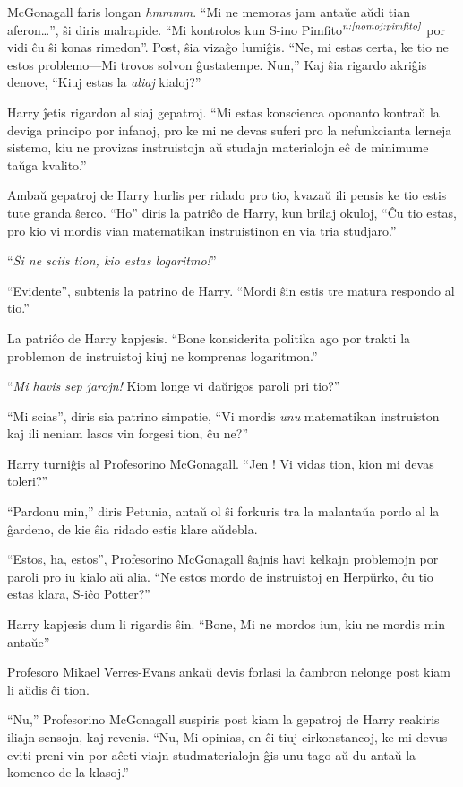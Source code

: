 McGonagall faris longan \emph{hmmmm}. ``Mi ne memoras jam antaŭe aŭdi
tian aferon\ldots{}'', ŝi diris malrapide. ``Mi kontrolos kun S-ino
Pimfito$^{\textit{n:\ref{nomoj:pimfito}}}$ por vidi ĉu ŝi konas rimedon''. Post,
ŝia vizaĝo lumiĝis. ``Ne, mi estas certa, ke tio ne estos problemo—Mi
trovos solvon ĝustatempe. Nun,'' Kaj ŝia rigardo akriĝis denove,
``Kiuj estas la \emph{aliaj} kialoj?''

Harry ĵetis rigardon al siaj gepatroj. ``Mi estas konscienca oponanto
kontraŭ la deviga principo por infanoj, pro ke mi ne devas suferi pro
la nefunkcianta lerneja sistemo, kiu ne provizas instruistojn aŭ
studajn materialojn eĉ de minimume taŭga kvalito.''

Ambaŭ gepatroj de Harry hurlis per ridado pro tio, kvazaŭ ili
pensis ke tio estis tute granda ŝerco. ``Ho'' diris la patriĉo de Harry,
kun brilaj okuloj, ``Ĉu tio estas, pro kio vi mordis vian matematikan
instruistinon en via tria studjaro.''

``\emph{Ŝi ne sciis tion, kio estas logaritmo!}''

``Evidente'', subtenis la patrino de Harry. ``Mordi ŝin estis tre matura
respondo al tio.''

La patriĉo de Harry kapjesis. ``Bone konsiderita politika ago por trakti la
problemon de instruistoj kiuj ne komprenas logaritmon.''

``\emph{Mi havis sep jarojn!} Kiom longe vi daŭrigos paroli pri tio?''

``Mi scias'', diris sia patrino simpatie, ``Vi mordis \emph{unu} matematikan
instruiston kaj ili neniam lasos vin forgesi tion, ĉu ne?''

Harry turniĝis al Profesorino McGonagall. ``Jen ! Vi vidas tion, kion mi
devas toleri?''

``Pardonu min,'' diris Petunia, antaŭ ol ŝi forkuris tra la malantaŭa
pordo al la ĝardeno, de kie ŝia ridado estis klare aŭdebla.

``Estos, ha, estos'', Profesorino McGonagall ŝajnis havi kelkajn
problemojn por paroli pro iu kialo aŭ alia. ``Ne estos mordo de
instruistoj en Herpŭrko, ĉu tio estas klara, S-iĉo Potter?''

Harry kapjesis dum li rigardis ŝin. ``Bone, Mi ne mordos iun, kiu ne mordis min antaŭe''

Profesoro Mikael Verres-Evans ankaŭ devis forlasi la ĉambron nelonge post kiam li aŭdis ĉi tion.

``Nu,'' Profesorino McGonagall suspiris post kiam la gepatroj de Harry
reakiris iliajn sensojn, kaj revenis. ``Nu, Mi opinias, en ĉi tiuj
cirkonstancoj, ke mi devus eviti preni vin por aĉeti viajn
studmaterialojn ĝis unu tago aŭ du antaŭ la komenco de la klasoj.''

